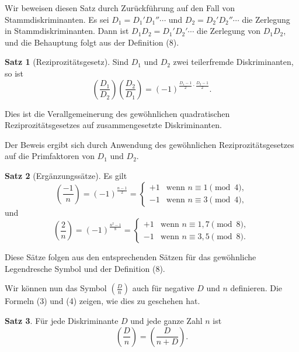 \documentclass[12pt,a4paper]{article}
\theoremstyle{definition}
\newtheorem*{satz}{Satz}
\begin{document}
Wir beweisen diesen Satz durch Zur\"uckf\"uhrung auf den Fall
von Stammdiskriminanten. Es sei $D_1 = D_1' D_1'' \cdots$
und $D_2 = D_2' D_2'' \cdots$ die Zerlegung in Stammdiskriminanten.
Dann ist $D_1 D_2 = D_1' D_2' \cdots$ die Zerlegung von
$D_1 D_2$, und die Behauptung folgt aus der Definition (8).

\begin{satz}[Reziprozit\"atsgesetz]
Sind $D_1$ und $D_2$ zwei teilerfremde Diskriminanten, so ist
\begin{equation}\tag{10}
\left(\frac{D_1}{D_2}\right) \left(\frac{D_2}{D_1}\right) = (-1)^{\frac{D_1-1}{2} \cdot \frac{D_2-1}{2}}.
\end{equation}
\end{satz}

Dies ist die Verallgemeinerung des gew\"ohnlichen quadratischen
Reziprozit\"atsgesetzes auf zusammengesetzte Diskriminanten.

Der Beweis ergibt sich durch Anwendung des gew\"ohnlichen
Reziprozit\"atsgesetzes auf die Primfaktoren von $D_1$ und $D_2$.

\begin{satz}[Erg\"anzungss\"atze]
Es gilt
\begin{equation}\tag{11}
\left(\frac{-1}{n}\right) = (-1)^{\frac{n-1}{2}} = \begin{cases}
+1 & \text{wenn } n \equiv 1 \pmod{4}, \\
-1 & \text{wenn } n \equiv 3 \pmod{4},
\end{cases}
\end{equation}
und
\begin{equation}\tag{12}
\left(\frac{2}{n}\right) = (-1)^{\frac{n^2-1}{8}} = \begin{cases}
+1 & \text{wenn } n \equiv 1, 7 \pmod{8}, \\
-1 & \text{wenn } n \equiv 3, 5 \pmod{8}.
\end{cases}
\end{equation}
\end{satz}

Diese S\"atze folgen aus den entsprechenden S\"atzen f\"ur das
gew\"ohnliche Legendresche Symbol und der Definition (8).

Wir k\"onnen nun das Symbol $\left(\frac{D}{n}\right)$ auch f\"ur negative
$D$ und $n$ definieren. Die Formeln (3) und (4) zeigen, wie
dies zu geschehen hat.

\begin{satz}
F\"ur jede Diskriminante $D$ und jede ganze Zahl $n$ ist
\begin{equation}\tag{13}
\left(\frac{D}{n}\right) = \left(\frac{D}{n + D}\right).
\end{equation}
\end{satz}
\end{document}
